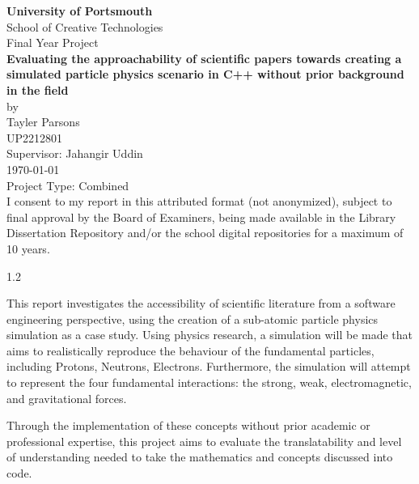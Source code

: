 \documentclass[12pt,a4paper]{report}
\begin{document}
\begin{titlepage}  
  \begin{center}
        {\bfseries\LARGE University of Portsmouth}\\[1em]
        {\Large School of Creative Technologies}\\[4em]

        {\large Final Year Project}\\[1em]
        
        {\Large\bfseries Evaluating the approachability of scientific papers towards creating a simulated particle physics scenario in C++ without prior background in the field}\\[2em]

        {\Large by}\\[1.0em]
        {\Large Tayler Parsons}\\
        {\Large UP2212801}\\[2em]

        Supervisor: Jahangir Uddin\\[1em]
        \today\\[2em]

        Project Type: Combined\\[1em]

        I consent to my report in this attributed format (not anonymized), subject to final approval by the Board of Examiners, 
        being made available in the Library Dissertation Repository and/or the school digital repositories for a maximum of 10 years.

        \vspace{1em}
         \hspace{0.25em} 

    \end{center}

    \vfill

    \setlength{\headheight}{14.5pt}
    \begin{spacing}{1.2}

   This report investigates the accessibility of scientific literature from a software engineering perspective, using the creation of a sub-atomic particle physics simulation
   as a case study. Using physics research, a simulation will be made that aims to realistically reproduce the behaviour of the fundamental particles, including Protons,
   Neutrons, Electrons. Furthermore, the simulation will attempt to represent the four fundamental interactions: the strong, weak, electromagnetic, and gravitational forces.

   Through the implementation of these concepts without prior academic or professional expertise, this project aims to evaluate the translatability and level of understanding
   needed to take the mathematics and concepts discussed into code.
  \end{spacing}
\end{titlepage}
\end{document}
